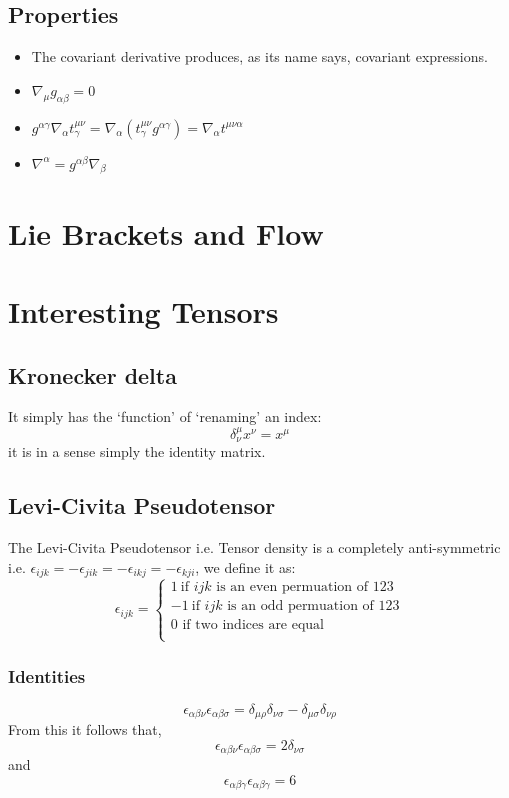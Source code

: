 \subsection{Properties}
\begin{itemize}
\item The covariant derivative produces, as its name says, covariant expressions.
\item $\nabla_{\mu} g_{\alpha \beta} = 0$
\item $g^{\alpha \gamma} \nabla_{\alpha}t^{\mu \nu}_{\gamma} = \nabla_{\alpha}(t^{\mu \nu}_{\gamma}g^{\alpha \gamma}) = \nabla_{\alpha}t^{\mu \nu \alpha}$
\item $\nabla^{\alpha} = g^{\alpha \beta}\nabla_{\beta}$
\end{itemize}
\section{Lie Brackets and Flow}
\section{Interesting Tensors}
\subsection{Kronecker delta}
It simply has the ‘function’ of ‘renaming’ an index:
$$\delta^{\mu}_{\nu} x^{\nu} = x^{\mu}$$
it is in a sense simply the identity matrix.
\subsection{Levi-Civita Pseudotensor}
\label{Levi}
The Levi-Civita Pseudotensor i.e. Tensor density is a completely anti-symmetric i.e. $\epsilon_{ijk} = -\epsilon_{jik} = -\epsilon_{ikj} = -\epsilon_{kji}$, we define it as:
\begin{equation}
\epsilon_{ijk} = \begin{cases}
1 \ \text{if } ijk \text{ is an even permuation of } 123\\
-1 \ \text{if } ijk \text{ is an odd permuation of } 123\\
0  \text{ if two indices are equal}\\
\end{cases}
\end{equation}
\subsubsection{Identities}
\begin{equation}
\epsilon_{\alpha \beta \nu}\epsilon_{\alpha \beta \sigma} = \delta_{\mu \rho} \delta_{\nu \sigma} - \delta_{\mu \sigma}\delta_{\nu \rho}
\end{equation}
From this it follows that,
\begin{equation}
\epsilon_{\alpha \beta \nu}\epsilon_{\alpha \beta \sigma} = 2\delta_{\nu \sigma}
\end{equation}
and
\begin{equation}
\epsilon_{\alpha \beta \gamma}\epsilon_{\alpha \beta \gamma} = 6
\end{equation}
